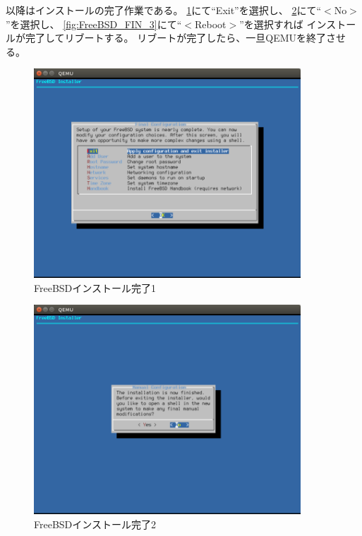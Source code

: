 \documentclass[a4j]{jarticle}
\begin{document}
\begin{multicols}{2}
以降はインストールの完了作業である。
\ref{fig:FreeBSD_FIN_1}にて``Exit''を選択し、
\ref{fig:FreeBSD_FIN_2}にて``$<$No$>$''を選択し、
\ref{fig:FreeBSD_FIN_3}にて``$<$Reboot$>$''を選択すれば
インストールが完了してリブートする。
リブートが完了したら、一旦QEMUを終了させる。
\begin{figure}[htbp]
	\begin{center}
    	\includegraphics[width=10cm]{./IMG/FreeBSD_FIN.png}
	\end{center}
    \caption{FreeBSDインストール完了1}
    \label{fig:FreeBSD_FIN_1}
\end{figure}
\begin{figure}[htbp]
	\begin{center}
    	\includegraphics[width=10cm]{./IMG/FreeBSD_LST.png}
	\end{center}
    \caption{FreeBSDインストール完了2}
    \label{fig:FreeBSD_FIN_2}
\end{figure}
\begin{figure}[htbp]
	\begin{center}

\end{center}
\end{figure}
\end{multicols}
\end{document}
